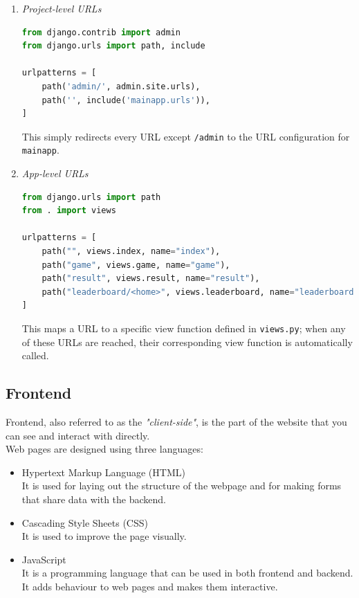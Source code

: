 \documentclass[12pt, a4paper]{report}
\begin{document}
    \begin{enumerate}
        \item \textit{Project-level URLs}\\
        \begin{lstlisting}[language=Python, caption=sudoku/urls.py]
from django.contrib import admin
from django.urls import path, include

urlpatterns = [
    path('admin/', admin.site.urls),
    path('', include('mainapp.urls')),
]
        \end{lstlisting}
        This simply redirects every URL except \texttt{/admin} to the URL configuration for \texttt{mainapp}.
        \item \textit{App-level URLs}
        \begin{lstlisting}[language=Python, caption=mainapp/urls.py]
from django.urls import path
from . import views

urlpatterns = [
    path("", views.index, name="index"),
    path("game", views.game, name="game"),
    path("result", views.result, name="result"),
    path("leaderboard/<home>", views.leaderboard, name="leaderboard")
]
        \end{lstlisting}
        This maps a URL to a specific view function defined in \texttt{views.py}; when any of these URLs are reached, their corresponding view function is automatically called.
    \end{enumerate}
    
        \subsection{Frontend}
    Frontend, also referred to as the \emph{"client-side"}, is the part of the website that you can see and interact with directly.\\
    
    Web pages are designed using three languages:
    \begin{itemize}
        \item Hypertext Markup Language (HTML)\\
        It is used for laying out the structure of the webpage 
        and for making forms that share data with the backend.
        \item Cascading Style Sheets (CSS)\\
        It is used to improve the page visually.
        \item JavaScript\\
        It is a programming language that can be used in both frontend and backend. It adds behaviour to web pages and
        makes them interactive. 
    \end{itemize}
    
\end{document}
